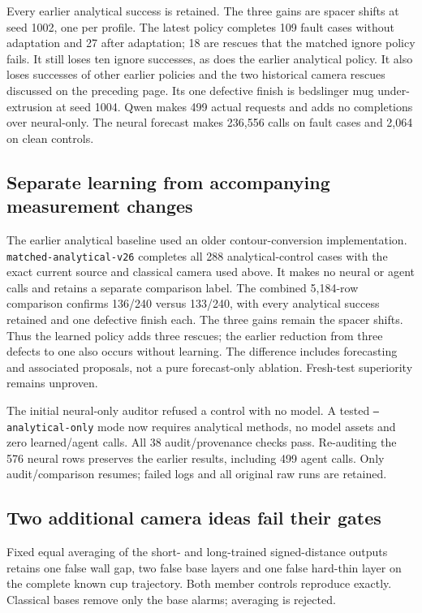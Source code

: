 \documentclass[10pt,letterpaper]{article}
\begin{document}
Every earlier analytical success is retained. The three gains are spacer shifts
at seed 1002, one per profile. The latest policy completes 109 fault cases without
adaptation and 27 after adaptation; 18 are rescues that the matched ignore policy
fails. It still loses ten ignore successes, as does the earlier analytical policy.
It also loses successes of other earlier policies and the two historical camera
rescues discussed on the preceding page. Its one defective finish is bedslinger
mug under-extrusion at seed 1004. Qwen makes 499 actual requests and adds no
completions over neural-only. The neural forecast makes 236,556 calls on fault
cases and 2,064 on clean controls.

\subsection*{Separate learning from accompanying measurement changes}
The earlier analytical baseline used an older contour-conversion implementation.
\texttt{matched-analytical-v26} completes all 288 analytical-control cases with
the exact current source and classical camera used above. It makes no neural or
agent calls and retains a separate comparison label. The combined 5,184-row
comparison confirms 136/240 versus 133/240, with every analytical success retained
and one defective finish each. The three gains remain the spacer shifts. Thus
the learned policy adds three rescues; the earlier reduction from three defects
to one also occurs without learning. The difference includes forecasting and
associated proposals, not a pure forecast-only ablation. Fresh-test superiority
remains unproven.

The initial neural-only auditor refused a control with no model. A tested
\texttt{--analytical-only} mode now requires analytical methods, no model assets
and zero learned/agent calls. All 38 audit/provenance checks pass. Re-auditing
the 576 neural rows preserves the earlier results, including 499 agent calls.
Only audit/comparison resumes; failed logs and all original raw runs are retained.

\subsection*{Two additional camera ideas fail their gates}
Fixed equal averaging of the short- and long-trained signed-distance outputs
retains one false wall gap, two false base layers and one false hard-thin layer
on the complete known cup trajectory. Both member controls reproduce exactly.
Classical bases remove only the base alarms; averaging is rejected.
\end{document}
